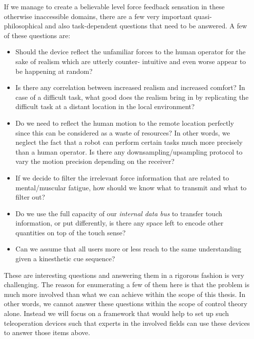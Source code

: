 If we manage to create a believable level force feedback sensation in these otherwise inaccessible domains, there are a few very 
important quasi-philosophical and also task-dependent questions that need to be answered. A few of these questions are:

\begin{itemize}
	\item Should the device reflect the unfamiliar forces to the human operator for the sake of realism which are utterly counter-
intuitive and even worse appear to be happening at random? 
    \item Is there any correlation between increased realism and increased comfort? In case of a difficult task, what good does the 
    realism bring in by replicating the difficult task at a distant location in the local environment?
    \item Do we need to reflect the human motion to the remote location perfectly since this can be considered as a waste of resources? 
    In other words, we neglect the fact that a robot can perform certain tasks much more precisely than a human operator. Is there any 
    downsampling/upsampling protocol to vary the motion precision depending on the receiver?
    \item If we decide to filter the irrelevant force information that are related to mental/muscular fatigue, how should we know what 
to transmit and what to filter out? 
    \item Do we use the full capacity of our \emph{internal data bus} to transfer touch information, or put differently, is there any 
space left to encode other quantities on top of the touch sense?
    \item Can we assume that all users more or less reach to the same understanding given a kinesthetic cue sequence?
\end{itemize}

These are interesting questions and answering them in a rigorous fashion is very challenging. The reason for enumerating a few of 
them here is that the problem is much more involved than what we can achieve within the scope of this thesis. In other words, we 
cannot answer these questions within the scope of control theory alone. Instead we will focus on a framework that would help to 
set up such teleoperation devices such that experts in the involved fields can use these devices to answer those items above. 



